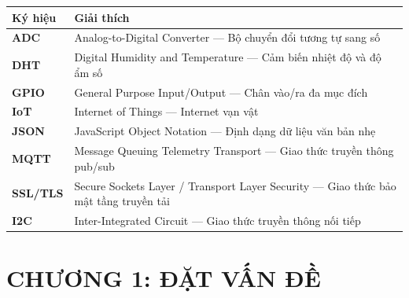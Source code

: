 \documentclass[12pt, a4paper]{article}
\begin{document}
\noindent
\begingroup
\renewcommand{\arraystretch}{1.2}%
\begin{tabularx}{\textwidth}{@{}C{2.5cm}X@{}}
  \toprule
  \textbf{Ký hiệu} & \textbf{Giải thích} \\
  \midrule
  \textbf{ADC}    & Analog-to-Digital Converter --- Bộ chuyển đổi tương tự sang số \\
  \textbf{DHT}    & Digital Humidity and Temperature --- Cảm biến nhiệt độ và độ ẩm số \\
  \textbf{GPIO}   & General Purpose Input/Output --- Chân vào/ra đa mục đích \\
  \textbf{IoT}    & Internet of Things --- Internet vạn vật \\
  \textbf{JSON}   & JavaScript Object Notation --- Định dạng dữ liệu văn bản nhẹ \\
  \textbf{MQTT}   & Message Queuing Telemetry Transport --- Giao thức truyền thông pub/sub \\
  \textbf{SSL/TLS}& Secure Sockets Layer / Transport Layer Security --- Giao thức bảo mật tầng truyền tải \\
  \textbf{I2C}    & Inter-Integrated Circuit --- Giao thức truyền thông nối tiếp \\
  \bottomrule
\end{tabularx}
\endgroup

\newpage

\thispagestyle{empty}
\vspace*{0.35\baselineskip}
{\normalsize
  \tableofcontents
}
\newpage

\thispagestyle{fancy}
\fontsize{13}{19.5}\selectfont

\section*{CHƯƠNG 1: ĐẶT VẤN ĐỀ}
{}
\label{sec:ch1}
\setcounter{section}{1}
\setcounter{subsection}{0}
\end{document}
